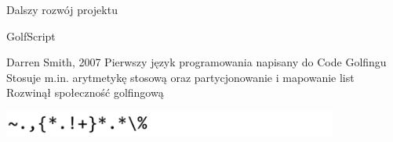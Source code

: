\begin{frame}{Dalszy rozwój projektu}

    {\large GolfScript}

    \begin{itemize}
        \myitem Darren Smith, 2007
        \myitem Pierwszy język programowania napisany do Code Golfingu
        \myitem Stosuje m.in. arytmetykę stosową oraz partycjonowanie i mapowanie list
        \myitem Rozwinął społeczność golfingową
    \end{itemize}

    \vspace{0.3cm}

    \begin{tcolorbox}[title={Test liczby pierwszej w GolfScript, 14 Bajtów {\color{blue} \hyperlink{frame:przypisy}{(13)}}}]
        {\includegraphics[width=11cm]{figures/primes_golfscript.png}}
    \end{tcolorbox}

\end{frame}
